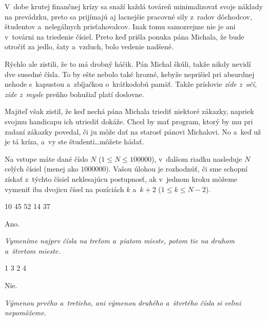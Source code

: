 



V~dobe krutej finančnej krízy sa snaží každá továreň minimalizovať svoje náklady na prevádzku,
preto sa prijímajú aj lacnejšie pracovné sily z~radov dôchodcov, študentov a~nelegálnych prisťahovalcov.
Inak tomu samozrejme nie je ani v~továrni na triedenie čísiel. Preto keď prišla ponuka pána Michala, že
bude otročiť za jedlo, šaty a~vzduch, bolo vedenie nadšené.

Rýchlo ale zistili, že to má drobný háčik. Pán
Michal škúli, takže nikdy nevidí dve susedné čísla. To by ešte nebolo také hrozné, kebyže neprišiel pri
absurdnej nehode s~kapustou a~zbíjačkou o~krátkodobú pamäť. Takže príslovie {\sl zíde z~očí,
zíde z~mysle} preňho bohužiaľ platí doslovne.

Majiteľ však zistil, že keď nechá pána Michala triediť niektoré
zákazky, napriek svojmu handicapu ich utriediť dokáže. Chcel by mať program, ktorý by mu pri zadaní zákazky
povedal, či ju môže dať na starosť pánovi Michalovi. No a~keď už je tá kríza, a~vy ste študenti\dots môžete hádať.

Na vstupe máte dané číslo $N$ ($1 \leq N \leq 100000$), v~ďalšom riadku nasleduje $N$ celých čísiel (menej ako $1000000$). Vašou úlohou je rozhodnúť,
či sme schopní získať z~týchto čísiel neklesajúcu postupnosť, ak v~jednom kroku môžeme
vymeniť iba dvojicu čísel na pozíciách $k$ a~$k+2$ ($1 \leq k \leq N - 2$).

10 45 52 14 37

\vystup
Ano.

\koniec
{\sl Vymeníme najprv čísla na treťom a~piatom mieste, potom tie na druhom a~štvrtom mieste.}

1 3 2 4

\vystup
Nie.

\koniec
{\sl Výmenou prvého a~tretieho, ani výmenou druhého a~štvrtého čísla si veľmi nepomôžeme.}


